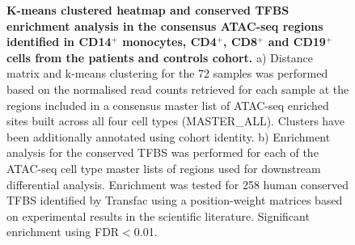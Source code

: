 \begin{figure}[H]
\caption[K-means clustered heatmap and conserved TFBS enrichment analysis in the consensus ATAC-seq regions identified in CD14$^+$ monocytes, CD4$^+$, CD8$^+$ and CD19$^+$ cells from the patients and controls cohort.]{\textbf{K-means clustered heatmap and conserved TFBS enrichment analysis in the consensus ATAC-seq regions identified in CD14$^+$ monocytes, CD4$^+$, CD8$^+$ and CD19$^+$ cells from the patients and controls cohort.} a) Distance matrix and k-means clustering for the 72 samples was performed based on the normalised read counts retrieved for each sample at the regions included in a consensus master list of ATAC-seq enriched sites built across all four cell types (MASTER\_ALL). Clusters have been additionally annotated using cohort identity. b) Enrichment analysis for the conserved TFBS was performed for each of the ATAC-seq cell type master lists of regions used for downstream differential analysis. Enrichment was tested for 258 human conserved TFBS identified by Transfac using a position-weight matrices based on experimental results in the scientific literature. Significant enrichment using FDR$<$0.01.}
\label{figure:ATAC_PS_CTL_heatmap_TFBS}
\end{figure}



